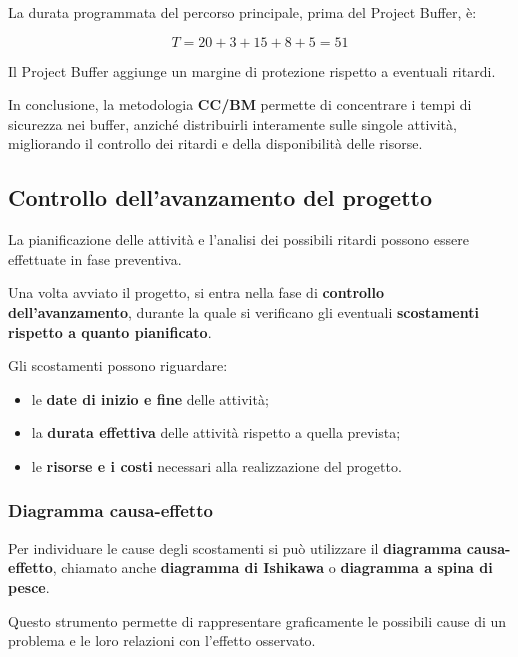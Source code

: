 \noindent La durata programmata del percorso principale,
prima del Project Buffer, è:

\[
T=20+3+15+8+5=\boxed{51}
\]

\noindent Il Project Buffer aggiunge un margine di protezione
rispetto a eventuali ritardi.

\medskip

\noindent In conclusione, la metodologia \textbf{CC/BM}
permette di concentrare i tempi di sicurezza nei buffer,
anziché distribuirli interamente sulle singole attività,
migliorando il controllo dei ritardi e della disponibilità
delle risorse.


\subsection{Controllo dell'avanzamento del progetto}

\noindent La pianificazione delle attività e l'analisi dei possibili ritardi
possono essere effettuate in fase preventiva.

\medskip

\noindent Una volta avviato il progetto, si entra nella fase di
\textbf{controllo dell'avanzamento}, durante la quale si verificano
gli eventuali \textbf{scostamenti rispetto a quanto pianificato}.

\medskip

\noindent Gli scostamenti possono riguardare:

\begin{itemize}
    \item le \textbf{date di inizio e fine} delle attività;
    \item la \textbf{durata effettiva} delle attività rispetto a quella prevista;
    \item le \textbf{risorse e i costi} necessari alla realizzazione del progetto.
\end{itemize}

\subsubsection*{Diagramma causa-effetto}

\noindent Per individuare le cause degli scostamenti si può utilizzare
il \textbf{diagramma causa-effetto}, chiamato anche
\textbf{diagramma di Ishikawa} o \textbf{diagramma a spina di pesce}.

\medskip

\noindent Questo strumento permette di rappresentare graficamente
le possibili cause di un problema e le loro relazioni con
l'effetto osservato.

